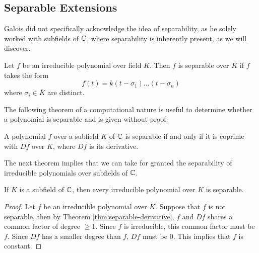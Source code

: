 %
%


\subsection{Separable Extensions}

Galois did not specifically acknowledge the idea of separability, as he solely worked with subfields of $\mathbb C$, where separability is inherently present, as we will discover.

\begin{definition}
    Let $f$ be an irreducible polynomial over field $K$. Then $f$ is separable over $K$ if $f$ takes the form 
    $$
        f(t) = k(t - \sigma_1) \dots (t - \sigma_n)
    $$
    where $\sigma_i \in \overline K$ are distinct.
\end{definition}

The following theorem of a computational nature is useful to determine whether a polynomial is separable and is given without proof. 

\begin{theorem} \label{thm:separable-derivative}
    A polynomial $f$ over a subfield $K$ of $\mathbb C$ is separable if and only if it is coprime with $Df$ over $K$, where $Df$ is its derivative. 
\end{theorem}

The next theorem implies that we can take for granted the separability of irreducible polynomials over subfields of $\mathbb C$. 

\begin{theorem} \label{thm:separable-poly-in-C}
    If $K$ is a subfield of $\mathbb C$, then every irreducible polynomial over $K$ is separable. 
\end{theorem}

\begin{proof}
    Let $f$ be an irreducible polynomial over $K$. Suppose that $f$ is not separable, then by Theorem \ref{thm:separable-derivative}, $f$ and $Df$ shares a common factor of degree $\ge 1$. Since $f$ is irreducible, this common factor must be $f$. Since $Df$ has a smaller degree than $f$, $Df$ must be $0$. This implies that $f$ is constant.
\end{proof}

